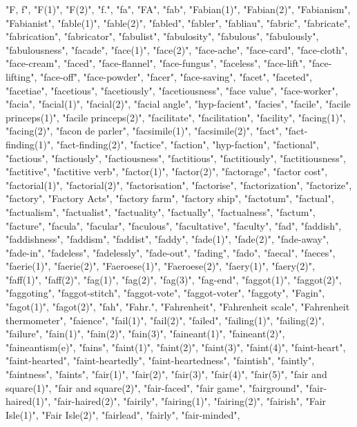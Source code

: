 "F, f",
"F(1)",
"F(2)",
"f.",
"fa",
"FA",
"fab",
"Fabian(1)",
"Fabian(2)",
"Fabianism",
"Fabianist",
"fable(1)",
"fable(2)",
"fabled",
"fabler",
"fabliau",
"fabric",
"fabricate",
"fabrication",
"fabricator",
"fabulist",
"fabulosity",
"fabulous",
"fabulously",
"fabulousness",
"facade",
"face(1)",
"face(2)",
"face-ache",
"face-card",
"face-cloth",
"face-cream",
"faced",
"face-flannel",
"face-fungus",
"faceless",
"face-lift",
"face-lifting",
"face-off",
"face-powder",
"facer",
"face-saving",
"facet",
"faceted",
"facetiae",
"facetious",
"facetiously",
"facetiousness",
"face value",
"face-worker",
"facia",
"facial(1)",
"facial(2)",
"facial angle",
"hyp-facient",
"facies",
"facile",
"facile princeps(1)",
"facile princeps(2)",
"facilitate",
"facilitation",
"facility",
"facing(1)",
"facing(2)",
"facon de parler",
"facsimile(1)",
"facsimile(2)",
"fact",
"fact-finding(1)",
"fact-finding(2)",
"factice",
"faction",
"hyp-faction",
"factional",
"factious",
"factiously",
"factiousness",
"factitious",
"factitiously",
"factitiousness",
"factitive",
"factitive verb",
"factor(1)",
"factor(2)",
"factorage",
"factor cost",
"factorial(1)",
"factorial(2)",
"factorisation",
"factorise",
"factorization",
"factorize",
"factory",
"Factory Acts",
"factory farm",
"factory ship",
"factotum",
"factual",
"factualism",
"factualist",
"factuality",
"factually",
"factualness",
"factum",
"facture",
"facula",
"facular",
"faculous",
"facultative",
"faculty",
"fad",
"faddish",
"faddishness",
"faddism",
"faddist",
"faddy",
"fade(1)",
"fade(2)",
"fade-away",
"fade-in",
"fadeless",
"fadelessly",
"fade-out",
"fading",
"fado",
"faecal",
"faeces",
"faerie(1)",
"faerie(2)",
"Faeroese(1)",
"Faeroese(2)",
"faery(1)",
"faery(2)",
"faff(1)",
"faff(2)",
"fag(1)",
"fag(2)",
"fag(3)",
"fag-end",
"faggot(1)",
"faggot(2)",
"faggoting",
"faggot-stitch",
"faggot-vote",
"faggot-voter",
"faggoty",
"Fagin",
"fagot(1)",
"fagot(2)",
"fah",
"Fahr.",
"Fahrenheit",
"Fahrenheit scale",
"Fahrenheit thermometer",
"faience",
"fail(1)",
"fail(2)",
"failed",
"failing(1)",
"failing(2)",
"failure",
"fain(1)",
"fain(2)",
"fain(3)",
"faineant(1)",
"faineant(2)",
"faineantism(e)",
"fains",
"faint(1)",
"faint(2)",
"faint(3)",
"faint(4)",
"faint-heart",
"faint-hearted",
"faint-heartedly",
"faint-heartedness",
"faintish",
"faintly",
"faintness",
"faints",
"fair(1)",
"fair(2)",
"fair(3)",
"fair(4)",
"fair(5)",
"fair and square(1)",
"fair and square(2)",
"fair-faced",
"fair game",
"fairground",
"fair-haired(1)",
"fair-haired(2)",
"fairily",
"fairing(1)",
"fairing(2)",
"fairish",
"Fair Isle(1)",
"Fair Isle(2)",
"fairlead",
"fairly",
"fair-minded",

